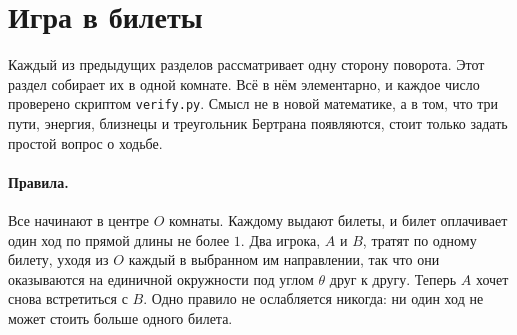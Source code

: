 \section{Игра в билеты}\label{sec:tickets}

Каждый из предыдущих разделов рассматривает одну сторону поворота. Этот раздел собирает их
в одной комнате. Всё в нём элементарно, и каждое число проверено скриптом \texttt{verify.py}.
Смысл не в новой математике, а в том, что три пути, энергия, близнецы и треугольник
Бертрана появляются, стоит только задать простой вопрос о ходьбе.

\paragraph{Правила.} Все начинают в центре $O$ комнаты. Каждому выдают
билеты, и билет оплачивает один ход по прямой длины не более $1$. Два игрока, $A$ и
$B$, тратят по одному билету, уходя из $O$ каждый в выбранном им направлении, так что
они оказываются на единичной окружности под углом $\theta$ друг к другу. Теперь $A$ хочет снова встретиться с $B$. Одно
правило не ослабляется никогда: ни один ход не может стоить больше одного билета.

